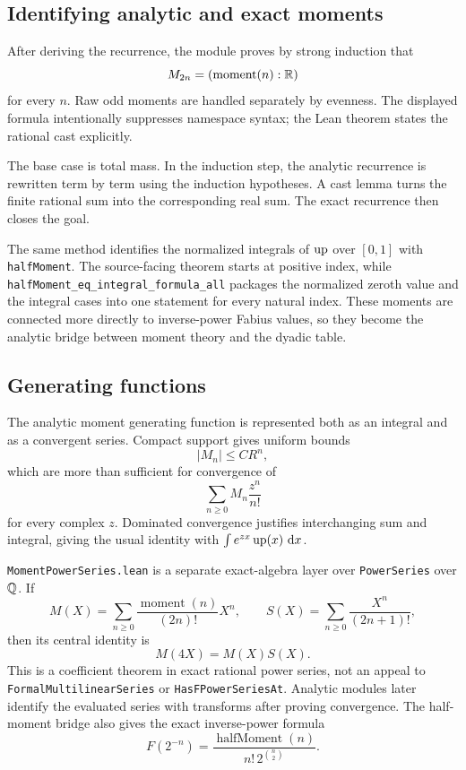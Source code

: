 \documentclass[11pt,oneside]{article}
\theoremstyle{definition}
\theoremstyle{remark}
\begin{document}
\subsection{Identifying analytic and exact moments}
After deriving the recurrence, the module proves by strong induction that
\[
  M_{2n}=(\operatorname{moment}(n):\mathbb{R})
\]
for every \(n\).  Raw odd moments are handled separately by evenness.  The displayed formula intentionally suppresses namespace syntax; the Lean theorem states the rational cast explicitly.

The base case is total mass.  In the induction step, the analytic recurrence is rewritten term by term using the induction hypotheses.  A cast lemma turns the finite rational sum into the corresponding real sum.  The exact recurrence then closes the goal.

The same method identifies the normalized integrals of \(\operatorname{up}\) over \([0,1]\) with \nolinkurl{halfMoment}.  The
source-facing theorem starts at positive index, while
\nolinkurl{halfMoment_eq_integral_formula_all} packages the normalized zeroth value
and the integral cases into one statement for every natural index.  These
moments are connected more directly to inverse-power Fabius values, so they
become the analytic bridge between moment theory and the dyadic table.

\subsection{Generating functions}
The analytic moment generating function is represented both as an integral and as a convergent series.  Compact support gives uniform bounds
\[
  |M_n|\leq C R^n,
\]
which are more than sufficient for convergence of
\[
  \sum_{n\geq0} M_n\frac{z^n}{n!}
\]
for every complex \(z\).  Dominated convergence justifies interchanging sum and integral, giving the usual identity with \(\int e^{zx}\operatorname{up}(x)\,\mathop{}\!\mathrm{d} x\).

\nolinkurl{MomentPowerSeries.lean} is a separate exact-algebra layer over
\nolinkurl{PowerSeries} over \(\mathbb{Q}\).  If
\[
 M(X)=\sum_{n\geq0}\frac{\operatorname{moment}(n)}{(2n)!}X^n,
 \qquad
 S(X)=\sum_{n\geq0}\frac{X^n}{(2n+1)!},
\]
then its central identity is
\[
  M(4X)=M(X)S(X).
\]
This is a coefficient theorem in exact rational power series, not an appeal to
\nolinkurl{FormalMultilinearSeries} or \nolinkurl{HasFPowerSeriesAt}.  Analytic modules
later identify the evaluated series with transforms after proving convergence.
The half-moment bridge also gives the exact inverse-power formula
\[
  F(2^{-n})=
  \frac{\operatorname{halfMoment}(n)}{n!\,2^{\binom n2}}.
\]
\end{document}
